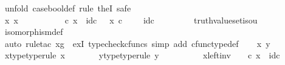 \begin{isabellebody}
%
\isadelimproof
%
\endisadelimproof
%
\isatagproof
{}\isamarkupfalse%
\ {\isacharparenleft}{\kern0pt}unfold\ case{\isacharunderscore}{\kern0pt}bool{\isacharunderscore}{\kern0pt}def{\isacharcomma}{\kern0pt}\ rule\ theI{\isacharprime}{\kern0pt}{\isacharcomma}{\kern0pt}\ safe{\isacharparenright}{\kern0pt}\isanewline
\ \ \isamarkupfalse%
\ {\isachardoublequoteopen}{\isasymexists}x{\isachardot}{\kern0pt}\ x\ {\isacharcolon}{\kern0pt}\ {\isasymOmega}\ {\isasymrightarrow}\ {\isasymone}\ {\isasymCoprod}\ {\isasymone}\ {\isasymand}\ {\isasymt}\ {\isasymamalg}\ {\isasymf}\ {\isasymcirc}\isactrlsub c\ x\ {\isacharequal}{\kern0pt}\ id\isactrlsub c\ {\isasymOmega}\ {\isasymand}\ x\ {\isasymcirc}\isactrlsub c\ {\isasymt}\ {\isasymamalg}\ {\isasymf}\ {\isacharequal}{\kern0pt}\ id\isactrlsub c\ {\isacharparenleft}{\kern0pt}{\isasymone}\ {\isasymCoprod}\ {\isasymone}{\isacharparenright}{\kern0pt}{\isachardoublequoteclose}\isanewline
\ \ \ \ \isamarkupfalse%
\ truth{\isacharunderscore}{\kern0pt}value{\isacharunderscore}{\kern0pt}set{\isacharunderscore}{\kern0pt}iso{\isacharunderscore}{\kern0pt}{}u{}\ \isamarkupfalse%
\ isomorphism{\isacharunderscore}{\kern0pt}def\isanewline
\ \ \ \ \isamarkupfalse%
\ {\isacharparenleft}{\kern0pt}auto{\isacharcomma}{\kern0pt}\ rule{\isacharunderscore}{\kern0pt}tac\ x{\isacharequal}{\kern0pt}g\ \ exI{\isacharcomma}{\kern0pt}\ typecheck{\isacharunderscore}{\kern0pt}cfuncs{\isacharcomma}{\kern0pt}\ simp\ add{\isacharcolon}{\kern0pt}\ cfunc{\isacharunderscore}{\kern0pt}type{\isacharunderscore}{\kern0pt}def{\isacharparenright}{\kern0pt}\isanewline
{}\isamarkupfalse%
\isanewline
\ \ \isamarkupfalse%
\ x\ y\isanewline
\ \ \isamarkupfalse%
\ x{\isacharunderscore}{\kern0pt}type{\isacharbrackleft}{\kern0pt}type{\isacharunderscore}{\kern0pt}rule{\isacharbrackright}{\kern0pt}{\isacharcolon}{\kern0pt}\ {\isachardoublequoteopen}x\ {\isacharcolon}{\kern0pt}\ {\isasymOmega}\ {\isasymrightarrow}\ {\isasymone}\ {\isasymCoprod}\ {\isasymone}{\isachardoublequoteclose}\ \ y{\isacharunderscore}{\kern0pt}type{\isacharbrackleft}{\kern0pt}type{\isacharunderscore}{\kern0pt}rule{\isacharbrackright}{\kern0pt}{\isacharcolon}{\kern0pt}\ {\isachardoublequoteopen}y\ {\isacharcolon}{\kern0pt}\ {\isasymOmega}\ {\isasymrightarrow}\ {\isasymone}\ {\isasymCoprod}\ {\isasymone}{\isachardoublequoteclose}\isanewline
\ \ \isamarkupfalse%
\ x{\isacharunderscore}{\kern0pt}left{\isacharunderscore}{\kern0pt}inv{\isacharcolon}{\kern0pt}\ {\isachardoublequoteopen}{\isasymt}\ {\isasymamalg}\ {\isasymf}\ {\isasymcirc}\isactrlsub c\ x\ {\isacharequal}{\kern0pt}\ id\isactrlsub c\ {\isasymOmega}{\isachardoublequoteclose}\isanewline

\end{isabellebody}
